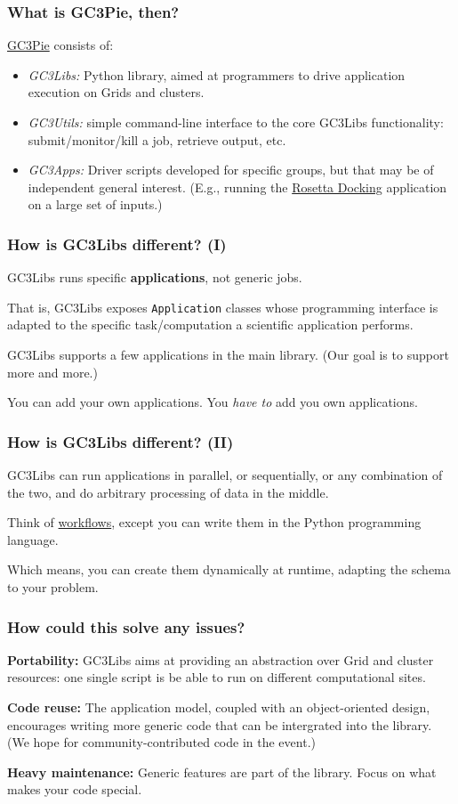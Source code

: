 \documentclass[presentation]{beamer}
\begin{document}
\begin{frame}
\frametitle{What is GC3Pie, then?}
\label{sec-4}

  \href{http://gc3pie.googlecode.com/}{GC3Pie} consists of:

\begin{itemize}
\item \emph{GC3Libs:} Python library, aimed at programmers to drive application
    execution on Grids and clusters.
\item \emph{GC3Utils:} simple command-line interface to the core GC3Libs
    functionality: submit/monitor/kill a job, retrieve output, etc.
\item \emph{GC3Apps:} Driver scripts developed for specific groups, but that
    may be of independent general interest.  (E.g., running the
    \href{http://www.rosettacommons.org/manuals/archive/rosetta3.1_user_guide/app_dock.html}{Rosetta Docking} application on a large set of inputs.)
\end{itemize}
\end{frame}
\begin{frame}
\frametitle{How is GC3Libs different? (I)}
\label{sec-5}

  GC3Libs runs specific \textbf{applications}, not generic jobs.

  That is, GC3Libs exposes \texttt{Application} classes whose programming
  interface is adapted to the specific task/computation a scientific
  application performs.

  GC3Libs supports a few applications in the main library.  (Our goal
  is to support more and more.)

  You can add your own applications.  You \emph{have to} add you own
  applications. 
\end{frame}
\begin{frame}
\frametitle{How is GC3Libs different? (II)}
\label{sec-6}

  GC3Libs can run applications in parallel, or sequentially, or any
  combination of the two, and do arbitrary processing of data in the
  middle.

  Think of \href{http://en.wikipedia.org/wiki/Scientific_workflow_system}{workflows}, except you can write them in the Python
  programming language.

  Which means, you can create them dynamically at runtime, adapting
  the schema to your problem.
\end{frame}
\begin{frame}
\frametitle{How could this solve any issues?}
\label{sec-7}

  \textbf{Portability:} GC3Libs aims at providing an abstraction over Grid
  and cluster resources: one single script is be able to run 
  on different computational sites.

  \textbf{Code reuse:} The application model, coupled with an object-oriented
  design, encourages writing more generic code that can be intergrated
  into the library.  (We hope for community-contributed code in the
  event.)

  \textbf{Heavy maintenance:} Generic features are part of the library. Focus
   on what makes your code special.
\end{frame}
\end{document}
